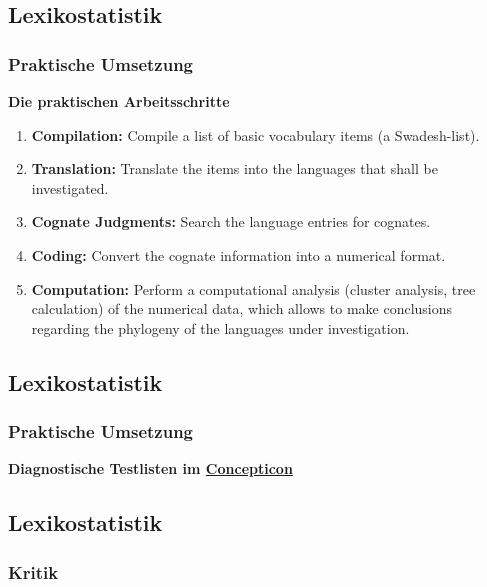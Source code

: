\subsection{\texorpdfstring{{Lexikostatistik}}{Lexikostatistik}}

\subsubsection{\texorpdfstring{{Praktische
Umsetzung}}{Praktische Umsetzung}}

\textbf{Die praktischen Arbeitsschritte}

\begin{enumerate}
\itemsep1pt\parskip0pt
\item
  \textbf{Compilation:} Compile a list of basic vocabulary items (a
  Swadesh-list).
\item
  \textbf{Translation:} Translate the items into the languages that
  shall be investigated.
\item
  \textbf{Cognate Judgments:} Search the language entries for cognates.
\item
  \textbf{Coding:} Convert the cognate information into a numerical
  format.
\item
  \textbf{Computation:} Perform a computational analysis (cluster
  analysis, tree calculation) of the numerical data, which allows to
  make conclusions regarding the phylogeny of the languages under
  investigation.
\end{enumerate}

\subsection{\texorpdfstring{{Lexikostatistik}}{Lexikostatistik}}

\subsubsection{\texorpdfstring{{Praktische
Umsetzung}}{Praktische Umsetzung}}

\textbf{Diagnostische Testlisten im
\href{http://concepticon.clld.org}{Concepticon}}

\subsection{\texorpdfstring{{Lexikostatistik}}{Lexikostatistik}}

\subsubsection{\texorpdfstring{{Kritik}}{Kritik}}

